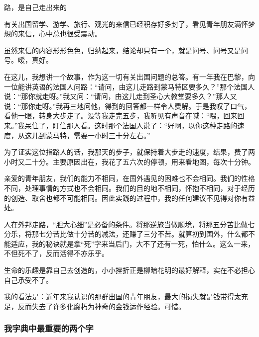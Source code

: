 \begin{center}
    \par 路，是自己走出来的
\end{center}
\par {}
\par 有关出国留学、游学、旅行、观光的来信已经积存好多封了，看见青年朋友满怀梦想的来信，心中总也很受震动。
\par 虽然来信的内容形形色色，归纳起来，结论却只有一个，就是问号、问号又是问号。嗳，真好。
\par 在这儿，我想讲一个故事，作为这一切有关出国问题的总答。有一年我在巴黎，向一位能讲英语的法国人问路：“请问，由这儿走路到蒙马特区要多久？”那个法国人说：“那你就走呀。”我又问：“请问，由这儿走到圣心大教堂要多久？”那人又说：“那你走呀。”我再三地问他，得到的回答都一样令人费解。于是我叹了口气，看他一眼，转身大步走了。没等我走完五步，我听见有声音在喊：“喂，回来回来。”我呆住了，盯住那人看。这时那个法国人说了：“好啊，以你这种走路的速度，从这儿到蒙马特，需要一小时三十分左右。”
\par 为了证实这位指路人的话，我那天的步子，就保持着大步走的速度，结果，费了两小时又二十分。主要原因出在，我花了五六次的停顿，用来看地图，每次十分钟。
\par 亲爱的青年朋友，我们的能力不相同，在国外遇见的困难也不会相同。我们的性格不同，处理事情的方式也不会相同。我们的目的地不相同，怀抱不相同，对于经历的创造、取舍也都不可能相同。因此实践的过程中，我的任何建议不见得对你有益处。
\par 人在外邦走路，“胆大心细”是必备的条件。将那逆旅当做顺境，将那五分苦比做七分乐，将那七分苦比做十分苦的减法，还赚了三分不苦。就算初到国外，什么都不能适应，我的秘诀就是拿“死”字来当后门，大不了还有一死，怕什么。这么一来，不但死不了，反而活得不亦乐乎。
\par 生命的乐趣是靠自己去创造的，小小挫折正是柳暗花明的最好解释，实在不必担心自己承受不了。
\par 我的看法是：近年来我认识的那群出国的青年朋友，最大的损失就是钱带得太充足，反而失去了许多化腐朽为神奇的金钱运作经验。可惜。
\par {}




\subsubsection{我字典中最重要的两个字}

